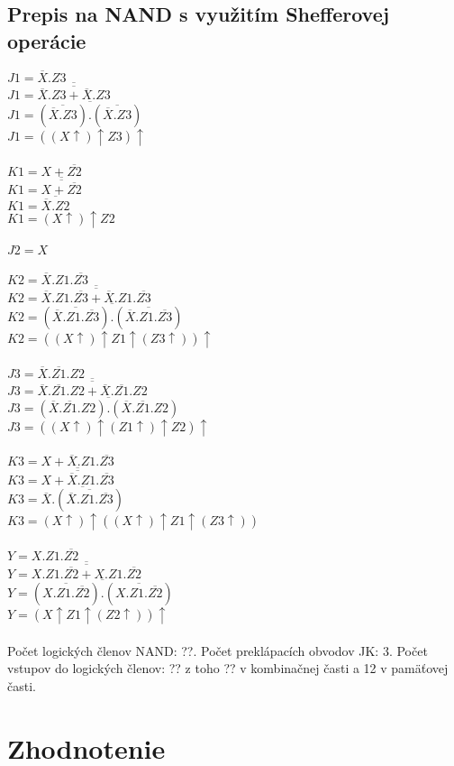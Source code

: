 \documentclass{article}
\begin{document}
\subsection{Prepis na NAND s využitím Shefferovej operácie}
$J1 = \overline{X}.Z3$\\
$J1 = \overline{\overline{\overline{X}.Z3+\overline{X}.Z3}}$\\
$J1 = \overline{(\overline{\overline{X}.Z3}).(\overline{\overline{X}.Z3})}$\\
$J1 = ((X\uparrow)\uparrow Z3)\uparrow$\\\\
$K1 = X+\overline{Z2}$\\
$K1 = \overline{\overline{X+\overline{Z2}}}$\\
$K1 = \overline{\overline{X}.Z2}$\\
$K1 = (X\uparrow)\uparrow Z2$\\\\
$J2 = X$\\\\
$K2 = \overline{X}.Z1.\overline{Z3}$\\
$K2 = \overline{\overline{\overline{X}.Z1.\overline{Z3}+\overline{X}.Z1.\overline{Z3}}}$\\
$K2 = \overline{(\overline{\overline{X}.Z1.\overline{Z3}}).(\overline{\overline{X}.Z1.\overline{Z3}})}$\\
$K2 = ((X\uparrow)\uparrow Z1\uparrow(Z3\uparrow))\uparrow$\\\\
$J3 = \overline{X}.\overline{Z1}.Z2$\\
$J3 = \overline{\overline{\overline{X}.\overline{Z1}.Z2+\overline{X}.\overline{Z1}.Z2}}$\\
$J3 = \overline{(\overline{X}.\overline{Z1}.Z2).(\overline{X}.\overline{Z1}.Z2)}$\\
$J3 = ((X\uparrow)\uparrow(Z1\uparrow)\uparrow Z2)\uparrow$\\\\
$K3 = X+\overline{X}.Z1.\overline{Z3}$\\
$K3 = \overline{\overline{X+\overline{X}.Z1.\overline{Z3}}}$\\
$K3 = \overline{\overline{X}.(\overline{\overline{X}.Z1.\overline{Z3}})}$\\
$K3 = (X\uparrow)\uparrow((X\uparrow)\uparrow Z1\uparrow(Z3\uparrow))$\\\\
$Y = X.Z1.\overline{Z2}$\\
$Y = \overline{\overline{X.Z1.\overline{Z2}+X.Z1.\overline{Z2}}}$\\
$Y = \overline{(\overline{X.Z1.\overline{Z2}}).(\overline{X.Z1.\overline{Z2}})}$\\
$Y = (X\uparrow Z1\uparrow(Z2\uparrow))\uparrow$\\\\
Počet logických členov NAND: ??. 
Počet preklápacích obvodov JK: 3. 
Počet vstupov do logických členov: ?? z toho ?? v kombinačnej časti a 12 v pamäťovej časti.

\section{Zhodnotenie}
\end{document}
